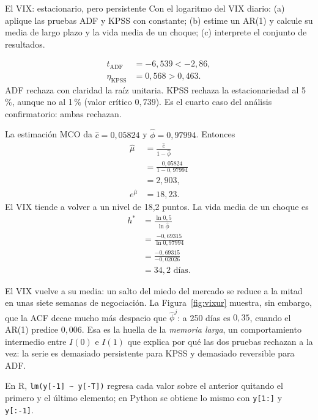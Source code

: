 \begin{ejresuelto}{El VIX: estacionario, pero persistente}\label{ej:vixur}
\enunciado Con el logaritmo del VIX diario: (a) aplique las pruebas ADF y KPSS con constante; (b) estime un
AR(1) y calcule su media de largo plazo y la vida media de un choque; (c) interprete el conjunto de
resultados.

\solucion
{}
\begin{align*}
  t_{\mathrm{ADF}}     &= -6{,}539 < -2{,}86,\\
  \eta_{\mathrm{KPSS}} &= 0{,}568 > 0{,}463 .
\end{align*}
ADF rechaza con claridad la raíz unitaria. KPSS rechaza la estacionariedad al 5\,\%, aunque no al 1\,\%
(valor crítico $0{,}739$). Es el cuarto caso del análisis confirmatorio: ambas rechazan.

 La estimación MCO da $\hat c=0{,}05824$ y $\hat\phi=0{,}97994$. Entonces
\begin{align*}
  \hat\mu &= \frac{\hat c}{1-\hat\phi}\\
          &= \frac{0{,}05824}{1-0{,}97994}\\
          &= 2{,}903,\\
  e^{\hat\mu} &= 18{,}23 .
\end{align*}
El VIX tiende a volver a un nivel de 18,2 puntos. La vida media de un choque es
\begin{align*}
  h^* &= \frac{\ln0{,}5}{\ln\hat\phi}\\
      &= \frac{-0{,}69315}{\ln0{,}97994}\\
      &= \frac{-0{,}69315}{-0{,}02026}\\
      &= 34{,}2 \text{ días}.
\end{align*}

 El VIX vuelve a su media: un salto del miedo del mercado se reduce a la mitad
en unas siete semanas de negociación. La Figura~\ref{fig:vixur} muestra, sin embargo, que la ACF decae mucho
más despacio que $\hat\phi^j$: a 250 días es $0{,}35$, cuando el AR(1) predice $0{,}006$. Esa es la huella de la \emph{memoria
larga}, un comportamiento intermedio entre $I(0)$ e $I(1)$ que explica por qué las dos pruebas rechazan a la
vez: la serie es demasiado persistente para KPSS y demasiado reversible para ADF.


\RvsPy En R, \texttt{lm(y[-1] \textasciitilde{} y[-T])} regresa cada valor sobre el anterior quitando el
primero y el último elemento; en Python se obtiene lo mismo con \texttt{y[1:]} y \texttt{y[:-1]}.


\end{ejresuelto}
